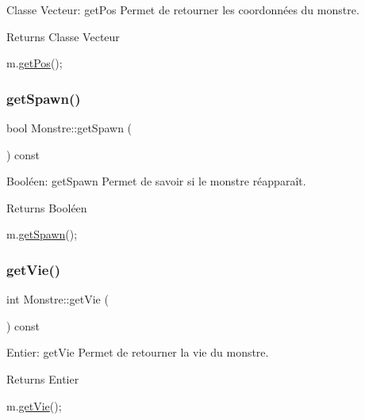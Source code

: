Classe Vecteur\+: get\+Pos Permet de retourner les coordonnées du monstre. 

\begin{DoxyReturn}{Returns}
Classe Vecteur 
\begin{DoxyCode}
m.\hyperlink{classMonstre_adbe0edd5d97aef18fb44ef163f368be6}{getPos}();
\end{DoxyCode}
 
\end{DoxyReturn}
\mbox{\label{classMonstre_a810f2e49356248d02f7b0e9b8ea16d85}} 
\subsubsection{\texorpdfstring{get\+Spawn()}{getSpawn()}}
{\footnotesize\ttfamily bool Monstre\+::get\+Spawn (\begin{DoxyParamCaption}{ }\end{DoxyParamCaption}) const}



Booléen\+: get\+Spawn Permet de savoir si le monstre réapparaît. 

\begin{DoxyReturn}{Returns}
Booléen 
\begin{DoxyCode}
m.\hyperlink{classMonstre_a810f2e49356248d02f7b0e9b8ea16d85}{getSpawn}();
\end{DoxyCode}
 
\end{DoxyReturn}
\mbox{\label{classMonstre_a60b049ee5c4060f8aa512974414b2129}} 
\subsubsection{\texorpdfstring{get\+Vie()}{getVie()}}
{\footnotesize\ttfamily int Monstre\+::get\+Vie (\begin{DoxyParamCaption}{ }\end{DoxyParamCaption}) const}



Entier\+: get\+Vie Permet de retourner la vie du monstre. 

\begin{DoxyReturn}{Returns}
Entier 
\begin{DoxyCode}
m.\hyperlink{classMonstre_a60b049ee5c4060f8aa512974414b2129}{getVie}();
\end{DoxyCode}
 
\end{DoxyReturn}
\mbox{\label{classMonstre_a8f94de3aed809fd81f283afce7c3feba}} 
